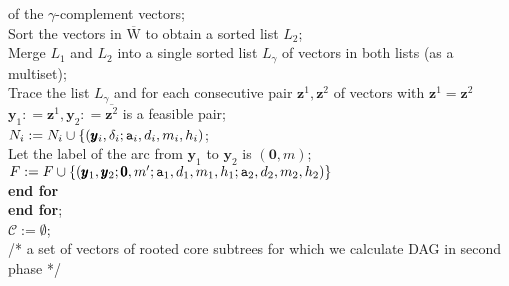 \documentclass[12pt]{article}
\newcommand{\ta}{{\tt a}}
\newcommand{\y}{\pmb{y}}
\newcommand{\z}{\pmb{z}}
\newcommand{\1}{\pmb{1}}
\newcommand{\0}{\pmb{0}}
\newcommand{\W}{\mathrm{W}}
\begin{document}
\begin{tabbing}
 of  the $\gamma$-complement vectors; \\ 
 Sort the vectors in  $\overline{\W}$ to
obtain a sorted list $L_2$;\\
Merge $L_1$ and $L_2$ into a single sorted list 
$L_{\gamma}$
of vectors in both lists (as a multiset);\\
Trace the list  $L_{\gamma}$ and for each consecutive pair 
$\z^1, \z^2$ of vectors 
       with $\z^1 = \z^2$\\
$\y_1: = \z^1, \y_2: = \overline{\z^2}$ is a feasible pair;\\
$N_i: = N_i \cup \{ (\y_i, \delta_i;\ta_i, d_{i}, m_{i}, h_i )$;
 		\\
 	 Let the label of the arc from 
 		$\y_1$ to $\y_2$ is $(\0, m)$; \\
 		$F: = F \cup \{(\y_1, \y_2; \0, m';  
 		\ta_1, d_1, m_1, h_1; \ta_2, d_{2}, m_{2}, h_2)\}$\-  \\
 {\bf end for} \- \\%
 {\bf end for}; \\%
$\mathcal{C}:= \emptyset$; \\/* a set of vectors of rooted core subtrees for which we calculate DAG in second phase */	\\	


\end{tabbing}
\end{document}
